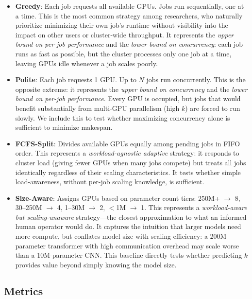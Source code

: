 \documentclass[letterpaper,10pt]{article}
\begin{document}
\begin{itemize}
    \item \textbf{Greedy}: Each job requests all available GPUs. Jobs run sequentially, one at a time. This is the most common strategy among researchers, who naturally prioritize minimizing their own job's runtime without visibility into the impact on other users or cluster-wide throughput. It represents the \textit{upper bound on per-job performance} and the \textit{lower bound on concurrency}: each job runs as fast as possible, but the cluster processes only one job at a time, leaving GPUs idle whenever a job scales poorly.

    \item \textbf{Polite}: Each job requests 1 GPU. Up to $N$ jobs run concurrently. This is the opposite extreme: it represents the \textit{upper bound on concurrency} and the \textit{lower bound on per-job performance}. Every GPU is occupied, but jobs that would benefit substantially from multi-GPU parallelism (high $k$) are forced to run slowly. We include this to test whether maximizing concurrency alone is sufficient to minimize makespan.

    \item \textbf{FCFS-Split}: Divides available GPUs equally among pending jobs in FIFO order. This represents a \textit{workload-agnostic adaptive} strategy: it responds to cluster load (giving fewer GPUs when many jobs compete) but treats all jobs identically regardless of their scaling characteristics. It tests whether simple load-awareness, without per-job scaling knowledge, is sufficient.

    \item \textbf{Size-Aware}: Assigns GPUs based on parameter count tiers: 250M+ $\rightarrow$ 8, 30--250M $\rightarrow$ 4, 1--30M $\rightarrow$ 2, $<$1M $\rightarrow$ 1. This represents a \textit{workload-aware but scaling-unaware} strategy---the closest approximation to what an informed human operator would do. It captures the intuition that larger models need more compute, but conflates model size with scaling efficiency: a 200M-parameter transformer with high communication overhead may scale worse than a 10M-parameter CNN. This baseline directly tests whether predicting $k$ provides value beyond simply knowing the model size.
\end{itemize}

\subsection{Metrics}
\end{document}
